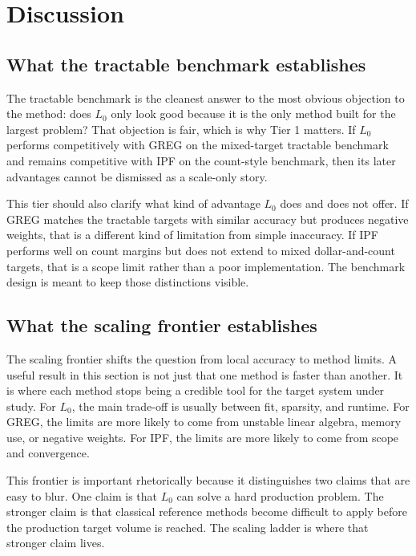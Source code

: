 \section{Discussion}
\label{sec:discussion}

\subsection{What the tractable benchmark establishes}

The tractable benchmark is the cleanest answer to the most obvious objection to the method: does
$L_0$ only look good because it is the only method built for the largest problem? That objection is
fair, which is why Tier 1 matters. If $L_0$ performs competitively with GREG on the mixed-target
tractable benchmark and remains competitive with IPF on the count-style benchmark, then its later
advantages cannot be dismissed as a scale-only story.

This tier should also clarify what kind of advantage $L_0$ does and does not offer. If GREG
matches the tractable targets with similar accuracy but produces negative weights, that is a
different kind of limitation from simple inaccuracy. If IPF performs well on count margins but does
not extend to mixed dollar-and-count targets, that is a scope limit rather than a poor
implementation. The benchmark design is meant to keep those distinctions visible.

\subsection{What the scaling frontier establishes}

The scaling frontier shifts the question from local accuracy to method limits. A useful result in
this section is not just that one method is faster than another. It is where each method stops
being a credible tool for the target system under study. For $L_0$, the main trade-off is usually
between fit, sparsity, and runtime. For GREG, the limits are more likely to come from unstable
linear algebra, memory use, or negative weights. For IPF, the limits are more likely to come from
scope and convergence.

This frontier is important rhetorically because it distinguishes two claims that are easy to blur.
One claim is that $L_0$ can solve a hard production problem. The stronger claim is that classical
reference methods become difficult to apply before the production target volume is reached. The
scaling ladder is where that stronger claim lives.

